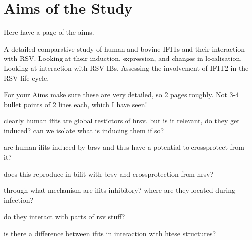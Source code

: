 
























\section{Aims of the Study} \label{sec:Aims}
Here have a page of the aims.

A detailed comparative study of human and bovine IFITs and their interaction with RSV. Looking at their induction, expression, and changes in localisation. Looking at interaction with RSV IBs. Assessing the involvement of IFIT2 in the RSV life cycle.

For your Aims make sure these are very detailed, so 2 pages roughly. Not 3-4 bullet points of 2 lines each, which I have seen!

clearly human ifits are global restictors of hrsv. but is it relevant, do they get induced? can we isolate what is inducing them if so? 

are human ifits induced by brsv and thus have a potential to crossprotect from it?

does this reproduce in bifit with brsv and crossprotection from hrsv?

through what mechanism are ifits inhibitory? where are they located during infection?

do they interact with parts of rsv stuff?

is there a difference between ifits in interaction with htese structures?


